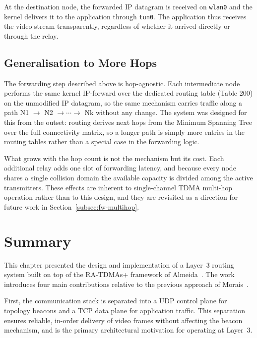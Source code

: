 At the destination node, the forwarded IP datagram is received on \texttt{wlan0} and the kernel delivers
it to the application through \texttt{tun0}. The application thus receives the video stream
transparently, regardless of whether it arrived directly or through the relay.

\subsection{Generalisation to More Hops}
\label{subsec:more-hops}

The forwarding step described above is hop-agnostic. Each intermediate node
performs the same kernel IP-forward over the dedicated routing table (Table 200)
on the unmodified IP datagram, so the same mechanism carries traffic along a path
N1 $\rightarrow$ N2 $\rightarrow \cdots \rightarrow$ Nk without any change. The
system was designed for this from the outset: routing derives next hops from the
Minimum Spanning Tree over the full connectivity matrix, so a longer path is
simply more entries in the routing tables rather than a special case in the
forwarding logic.

What grows with the hop count is not the mechanism but its cost. Each additional
relay adds one slot of forwarding latency, and because every node shares a single
collision domain the available capacity is divided among the active transmitters.
These effects are inherent to single-channel TDMA multi-hop operation rather than
to this design, and they are revisited as a direction for future work in
Section~\ref{subsec:fw-multihop}.



\section{Summary}
\label{sec:impl-summary}

This chapter presented the design and implementation of a Layer~3 routing system built on
top of the RA-TDMAs+ framework of Almeida~\cite{almeida2023synchronization}. The work
introduces four main contributions relative to the previous approach of
Morais~\cite{morais2024synchronization}.

First, the communication stack is separated into a UDP control plane for topology beacons
and a TCP data plane for application traffic. This separation ensures reliable, in-order
delivery of video frames without affecting the beacon mechanism, and is the primary
architectural motivation for operating at Layer~3.


